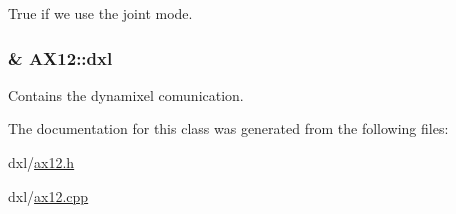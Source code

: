 True if we use the joint mode. 

\hypertarget{class_a_x12_a819a7760294ffa2022c5359155d6b51a}{}
\subsubsection[{dxl}]{\& A\+X12\+::dxl\hspace{0.3cm}{\ttfamily [private]}}\label{class_a_x12_a819a7760294ffa2022c5359155d6b51a}


Contains the dynamixel comunication. 



The documentation for this class was generated from the following files\+:\begin{DoxyCompactItemize}
\item 
dxl/\hyperlink{ax12_8h}{ax12.\+h}\item 
dxl/\hyperlink{ax12_8cpp}{ax12.\+cpp}\end{DoxyCompactItemize}

